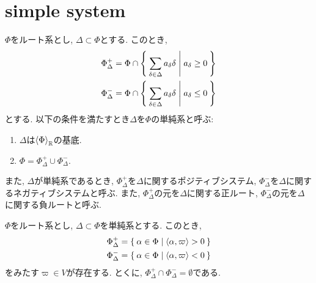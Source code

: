 \section{simple system}
\begin{definition}
  $\Phi$をルート系とし, $\Delta\subset\Phi$とする.
  このとき,
  \begin{align*}
    \Phi_{\Delta}^{+}&=\Phi\cap \Set{\sum_{\delta\in\Delta}a_\delta \delta|a_\delta \geq 0}\\
    \Phi_{\Delta}^{-}&=\Phi\cap \Set{\sum_{\delta\in\Delta}a_\delta \delta|a_\delta \leq 0}
  \end{align*}
  とする.
  以下の条件を満たすとき$\Delta$を$\Phi$の単純系と呼ぶ:
  \begin{enumerate}
  \item $\Delta$は$\Braket{\Phi}_{\mathbb{R}}$の基底.
  \item $\Phi = \Phi_\Delta^{+}\cup \Phi_\Delta^{-}$.
  \end{enumerate}
  また, $\Delta$が単純系であるとき,
  $\Phi_{\Delta}^+$を$\Delta$に関するポジティブシステム,
  $\Phi_{\Delta}^-$を$\Delta$に関するネガティブシステムと呼ぶ.
  また,
  $\Phi_{\Delta}^+$の元を$\Delta$に関する正ルート,
  $\Phi_{\Delta}^-$の元を$\Delta$に関する負ルートと呼ぶ.
\end{definition}
\begin{prop}
  \label{lemma:cone:sparable}
  $\Phi$をルート系とし, $\Delta\subset\Phi$を単純系とする.
  このとき,
  \begin{align*}
    \Phi_{\Delta}^+&=\Set{\alpha\in\Phi | \Braket{\alpha,\varpi} > 0}\\
    \Phi_{\Delta}^-&=\Set{\alpha\in\Phi | \Braket{\alpha,\varpi} < 0}
  \end{align*}
  をみたす$\varpi\in V$が存在する.
  とくに, 
  $\Phi_{\Delta}^+\cap\Phi_{\Delta}^-=\emptyset$である.
\end{prop}
